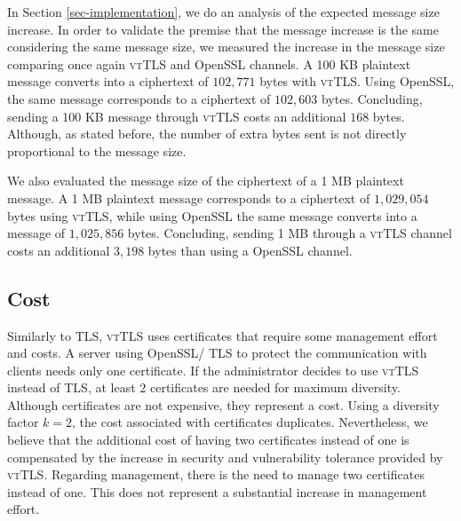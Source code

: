 \documentclass{sig-alternate-05-2015}
\begin{document}
In Section \ref{sec-implementation}, we  do an analysis of the expected message size increase. In order to validate the premise that the message increase is the same considering the same message size, we measured the increase in the message size comparing once again \textsc{vtTLS} and OpenSSL channels.
A 100 KB plaintext message converts into a ciphertext of $102,771$ bytes  with \textsc{vtTLS}. Using OpenSSL, the same message corresponds to a ciphertext of $102,603$ bytes. Concluding, sending a 100 KB message through \textsc{vtTLS} costs an additional $168$ bytes. Although, as stated before, the number of extra bytes sent is not directly proportional to the message size.

We also evaluated the message size of the ciphertext of a 1 MB plaintext message. A 1 MB plaintext message corresponds to a ciphertext of $1,029,054$ bytes using \textsc{vtTLS}, while using OpenSSL the same message converts into a message of $1,025,856$ bytes. Concluding, sending 1 MB through a \textsc{vtTLS} channel costs an additional $3,198$ bytes than using a OpenSSL channel.

\subsection{Cost}

Similarly to TLS, \textsc{vtTLS} uses certificates that require some management effort and costs.
A server using OpenSSL/ TLS to protect the communication with clients needs only one certificate. If the administrator decides to use \textsc{vtTLS} instead of TLS, at least $2$ certificates are needed for maximum diversity.
Although certificates are not  expensive, they represent a cost. %
%
Using a diversity factor $k = 2$, the cost associated with certificates duplicates. Nevertheless, we believe that the additional cost of having two certificates instead of one is compensated by the increase in security and vulnerability tolerance provided by \textsc{vtTLS}.
%
Regarding management, there is the need to manage two certificates instead of one. This does not represent a substantial increase in management effort. %
\end{document}
